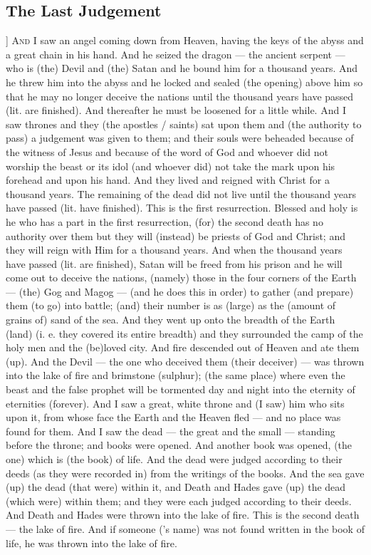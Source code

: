 \begin{pages}
\begin{Leftside}
        			\chapter{The Last Judgement}
				]		
		\renewcommand{\LettrineFontHook}{\Zallmanfamily}
		\lettrine[lines=3]{A}{nd} I saw an angel coming down from Heaven, having the keys of the abyss and a great chain in his hand. And he seized the dragon — the ancient serpent — who is (the) Devil and (the) Satan and he bound him for a thousand years. And he threw him into the abyss and he locked and sealed (the opening) above him so that he may no longer deceive the nations until the thousand years have passed (lit. are finished). And thereafter he must be loosened for a little while. 
		\pend
		\pstart
		And I saw thrones and they (the apostles / saints) sat upon them and (the authority to pass) a judgement was given to them; and their souls were beheaded because of the witness of Jesus and because of the word of God and whoever did not worship the beast or its idol (and whoever did) not take the mark upon his forehead and upon his hand. And they lived and reigned with Christ for a thousand years. The remaining of the dead did not live until the thousand years have passed (lit. have finished). This is the first resurrection. Blessed and holy is he who has a part in the first resurrection, (for) the second death has no authority over them but they will (instead) be priests of God and Christ; and they will reign with Him for a thousand years. 
		\pend
		\pstart
		And when the thousand years have passed (lit. are finished), Satan will be freed from his prison and he will come out to deceive the nations, (namely) those in the four corners of the Earth — (the) Gog and Magog — (and he does this in order) to gather (and prepare) them (to go) into battle; (and) their number is as (large) as the (amount of grains of) sand of the sea. And they went up onto the breadth of the Earth (land) (i. e. they covered its entire breadth) and they surrounded the camp of the holy men and the (be)loved city. And fire descended out of Heaven and ate them (up). And the Devil — the one who deceived them (their deceiver) — was thrown into the lake of fire and brimstone (sulphur); (the same place) where even the beast and the false prophet will be tormented day and night into the eternity of eternities (forever).
		\pend
		\pstart
		And I saw a great, white throne and (I saw) him who sits upon it, from whose face the Earth and the Heaven fled — and no place was found for them. And I saw the dead — the great and the small — standing before the throne; and books were opened. And another book was opened, (the one) which is (the book) of life. And the dead were judged according to their deeds (as they were recorded in) from the writings of the books. And the sea gave (up) the dead (that were) within it, and Death and Hades gave (up) the dead (which were) within them; and they were each judged according to their deeds. And Death and Hades were thrown into the lake of fire. This is the second death — the lake of fire. And if someone (’s name) was not found written in the book of life, he was thrown into the lake of fire. 
		\pend
        \endnumbering
    \end{Leftside}


\end{pages}
